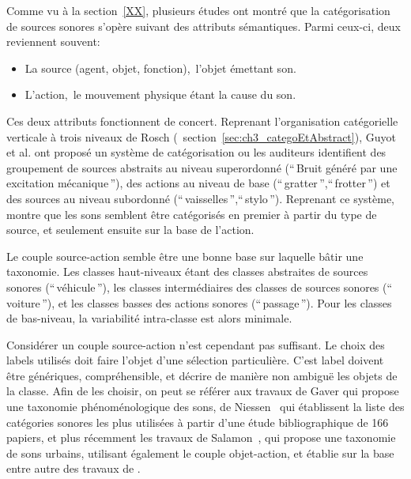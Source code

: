 Comme vu à la section~\ref{XX}, plusieurs études ont montré que la catégorisation de sources sonores s'opère suivant des attributs sémantiques. Parmi ceux-ci, deux reviennent souvent:

\begin{itemize}
\item La source (agent, objet, fonction),\ie~l'objet émettant son.
\item L'action,\ie~le mouvement physique étant la cause  du son.
\end{itemize} 

Ces deux attributs fonctionnent de concert. Reprenant l'organisation catégorielle verticale à trois niveaux de Rosch (\cf~section~\ref{sec:ch3_categoEtAbstract}), Guyot et al. \citep{guyot1997} ont proposé un système de catégorisation ou les auditeurs identifient des groupement de sources abstraits au niveau superordonné (``\,Bruit généré par une excitation mécanique\,''), des actions au niveau de base (``\,gratter\,'',``\,frotter\,'') et des sources au niveau subordonné (``\,vaisselles\,'',``\,stylo\,''). Reprenant ce système, \citep{houix_lexical_2012} montre que les sons semblent être catégorisés en premier à partir du type de source, et seulement ensuite sur la base de l'action.


Le couple source-action semble être une bonne base sur laquelle bâtir une taxonomie. Les classes haut-niveaux étant des classes abstraites de sources sonores (``\,véhicule\,''), les classes intermédiaires des classes de sources sonores (``\,voiture\,''), et les classes basses des actions sonores (``\,passage\,''). Pour les classes de bas-niveau, la variabilité intra-classe est alors minimale.

Considérer un couple source-action n'est cependant pas suffisant. Le choix des labels utilisés doit faire l'objet d'une sélection particulière. C'est label doivent être génériques, compréhensible, et décrire de manière non ambiguë les objets de la classe. Afin de les choisir, on peut se référer aux travaux de Gaver \citep{gaver1993world} qui propose une taxonomie phénoménologique des sons, de Niessen~\al \citep{niessen2010categories} qui établissent la liste des catégories sonores les plus utilisées à partir d'une étude bibliographique de 166 papiers, et plus récemment les travaux de Salamon~\al \citep{Salamon14}, qui propose une taxonomie de sons urbains, utilisant également le couple objet-action, et établie sur la base entre autre des travaux de \citep{brown2011towards}.

